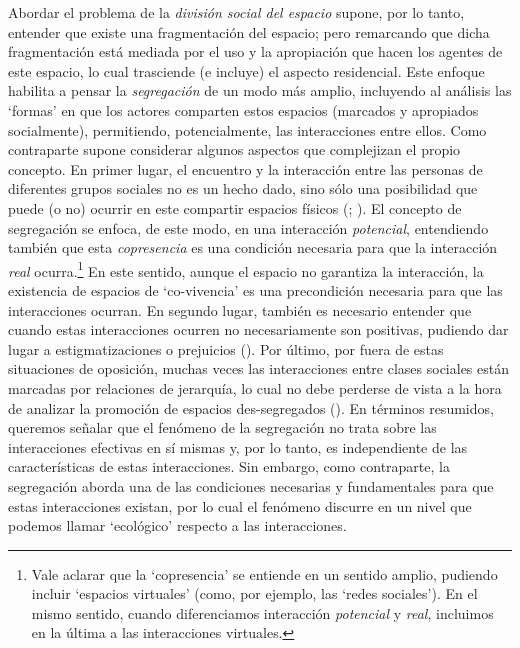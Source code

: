 \documentclass[
  spanish,
  a4paper,%
  chapterprefix=true,%
  DIV=calc,%
  twoside]{scrbook}%
\begin{document}
Abordar el problema de la \emph{división social del espacio} supone, por lo
tanto, entender que existe una fragmentación del espacio; pero
remarcando que dicha fragmentación está mediada por el uso y la
apropiación que hacen los agentes de este espacio, lo cual trasciende (e
incluye) el aspecto residencial. Este enfoque habilita a pensar la
\emph{segregación} de un modo más amplio, incluyendo al análisis las `formas'
en que los actores comparten estos espacios (marcados y apropiados
socialmente), permitiendo, potencialmente, las interacciones entre
ellos. Como contraparte supone considerar algunos aspectos que
complejizan el propio concepto.
En
primer lugar, el encuentro y la interacción entre las personas de
diferentes grupos sociales no es un hecho dado, sino sólo una
posibilidad que puede (o no) ocurrir en este compartir espacios físicos
(; ). El concepto de segregación se enfoca, de
este modo, en una interacción \emph{potencial}, entendiendo también que esta
\emph{copresencia} es una condición necesaria para que la interacción \emph{real}
ocurra.\footnote{Vale aclarar que la `copresencia' se entiende en un
  sentido amplio, pudiendo incluir `espacios virtuales' (como, por
  ejemplo, las `redes sociales'). En el mismo sentido, cuando
  diferenciamos interacción \emph{potencial} y \emph{real}, incluimos en la
  última a las interacciones virtuales.} En este sentido, aunque el espacio no
garantiza la interacción, la existencia de espacios de `co-vivencia' es
una precondición necesaria para que las interacciones ocurran.
En segundo lugar,
también es necesario entender que cuando estas interacciones ocurren no
necesariamente son positivas, pudiendo dar lugar a estigmatizaciones o
prejuicios (). Por
último, por fuera de estas situaciones de oposición, muchas veces las
interacciones entre clases sociales están marcadas por relaciones de
jerarquía, lo cual no debe perderse de vista a la hora de analizar la
promoción de espacios des-segregados ().
En
términos resumidos, queremos señalar que el fenómeno de la segregación
no trata sobre las interacciones efectivas en sí mismas y, por lo tanto,
es independiente de las características de estas interacciones. Sin
embargo, como contraparte, la segregación aborda una de las condiciones
necesarias y fundamentales para que estas interacciones existan, por lo
cual el fenómeno discurre en un nivel que podemos llamar `ecológico'
respecto a las interacciones.
\end{document}
